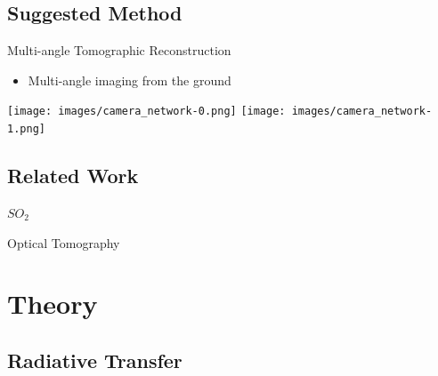 \documentclass[compress,red,12pt]{beamer}
\begin{document}

\subsection{Suggested Method}

\begin{frame}{Multi-angle Tomographic Reconstruction}
  \begin{itemize}
  \item <2-> Multi-angle imaging from the ground
  \end{itemize}
  \begin{center}
    {\texttt{[image: images/camera\_network-0.png]}}
    {\texttt{[image: images/camera\_network-1.png]}}
  \end{center}
\end{frame}


\subsection{Related Work}

\begin{frame}{$SO_2$}
  
\end{frame}

\begin{frame}{Optical Tomography}
  
\end{frame}



\section{Theory}


\subsection{Radiative Transfer}
\end{document}
